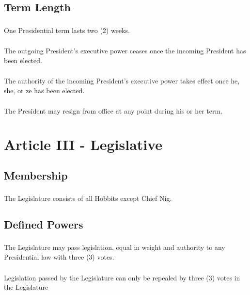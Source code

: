 \documentclass[]{article}
\begin{document}
\subsection{Term Length}
\subsubsection{}
One Presidential term lasts two (2) weeks.
\subsubsection{}
The outgoing President’s executive power ceases once the incoming President has been elected.
\subsubsection{}
The authority of the incoming President’s executive power takes effect once he, she, or ze has been elected.
\subsubsection{}
The President may resign from office at any point during his or her term. 

\section{Article III - Legislative}
\subsection{Membership}
\subsubsection{}
The Legislature consists of all Hobbits except Chief Nig.
\subsection{Defined Powers}
\subsubsection{}
The Legislature may pass legislation, equal in weight and authority to any Presidential law with three (3) votes.
\subsubsection{}
Legislation passed by the Legislature can only be repealed by three (3) votes in the Legislature
\end{document}
